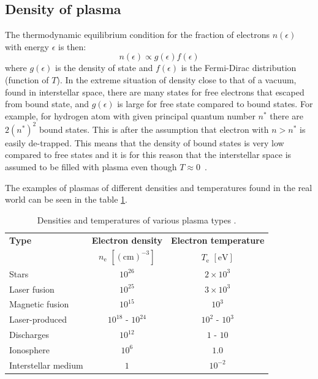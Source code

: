 \subsection*{Density of plasma}
The thermodynamic equilibrium condition for the fraction of electrons $n(\epsilon)$ with energy $\epsilon$ is then:
\begin{equation}
	n(\epsilon) \propto g(\epsilon)f(\epsilon)
\end{equation}
\noindent where $g(\epsilon)$ is the density of state and $f(\epsilon)$ is the Fermi-Dirac distribution (function of $T$). In the extreme situation of density close to that of a vacuum, found in interstellar space, there are many states for free electrons that escaped from bound state, and $g(\epsilon)$ is large for free state compared to bound states. For example, for hydrogen atom with given principal quantum number $n^*$ there are $2\left(n^{*}\right)^2$ bound states. This is after the assumption that electron with $n>n^*$ is easily de-trapped. This means that the density of bound states is very low compared to free states and it is for this reason that the interstellar space is assumed to be filled with plasma even though $T\approx0$~\cite{laser-plasma1}.

The examples of plasmas of different densities and temperatures found in the real world can be seen in the table \ref{tab:den-temp}.

\begin{table}[hb]
	\centering
	\begin{tabular}{lcc}
		\textbf{Type}		& \textbf{Electron density}			 			 	& \textbf{Electron temperature} \\ 
			 				& $n_\mathrm{e}$ $\left[\mathrm{(cm)}^{-3}\right]$  &  $T_\mathrm{e}$ $\left[\mathrm{eV}\right]$ \\ \hline
		Stars 				& $10^{26}$          	& $2 \times 10^3$       \\
		Laser fusion    	& $10^{25}$           	& $3 \times 10^3$       \\
		Magnetic fusion		& $10^{15}$ 			& $10^3$         		\\
		Laser-produced		& $10^{18}$ - $10^{24}$ & $10^2$ - $10^3$       \\
		Discharges			& $10^{12}$          	& $1$ - $10$         	\\
		Ionosphere		    & $10^6$            	& $1.0$         		\\
		Interstellar medium & $1$               	& $10^{-2}$         	\\ \hline
	\end{tabular}
	\caption{Densities and temperatures of various plasma types \cite{plasma-intro}.}
	
	\label{tab:den-temp}
\end{table}

